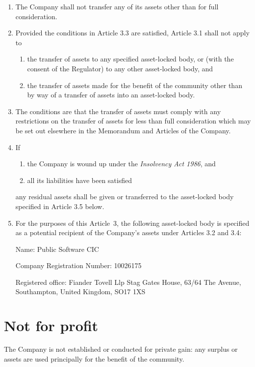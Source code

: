\documentclass[a4paper,12pt]{article}
\renewcommand{\labelenumii}{\thesection.\arabic{enumi}.\arabic{enumii}}
\begin{document}
\begin{enumerate}
  \item The Company shall not transfer any of its assets other than for full consideration. %
  \item Provided the conditions in Article 3.3 are satisfied, Article 3.1 shall not apply to %
  \begin{enumerate}
    \renewcommand{\labelenumii}{(\alph{enumii})}
    \item the transfer of assets to any specified asset-locked body, or (with the consent of the Regulator) to any other asset-locked body, and %
    \item the transfer of assets made for the benefit of the community other than by way of a transfer of assets into an asset-locked body. %
  \end{enumerate}
  \item The conditions are that the transfer of assets must comply with any restrictions on the transfer of assets for less than full consideration which may be set out elsewhere in the Memorandum and Articles of the Company. %
  \item If
  \begin{enumerate}
    \item the Company is wound up under the \textit{Insolvency Act 1986}, and
    \item all its liabilities have been satisfied
  \end{enumerate}
  any residual assets shall be given or transferred to the asset-locked body specified in Article 3.5 below.
  \item For the purposes of this Article 3, the following asset-locked body is specified as a potential recipient of the Company’s assets under Articles 3.2 and 3.4:\par Name: Public Software CIC\par Company Registration Number: 10026175\par Registered office: Fiander Tovell Llp Stag Gates House, 63/64 The Avenue, Southampton, United Kingdom, SO17 1XS
\end{enumerate}

\section{Not for profit}

The Company is not established or conducted for private gain: any surplus or assets are used principally for the benefit of the community.
\end{document}
